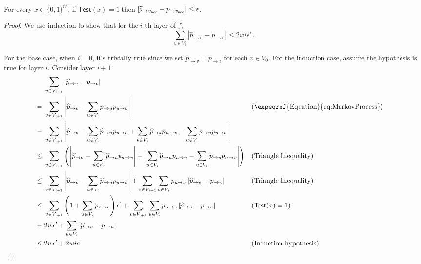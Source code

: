 \documentclass{toc}
\begin{document}
\begin{lemma} \label{lem:PassingTestGivesGoodApprox}
For every $x \in \{0, 1\}^{n'}$, if $ \mathsf{Test}(x) = 1 $ then $ \left| \widehat{p}_{ \to v_{\normalfont\text{acc}}} - p_{ \to v_{\normalfont\text{acc}} } \right| \leq \epsilon$.
\end{lemma}

\begin{proof}
We use induction to show that for the $i$-th layer of $f$,
\[ \sum_{v\in  V_i} \left|\widehat{p}_{\to v} - p_{ \to v} \right| \leq 2wi\epsilon'\,. \]

For the base case, when $i=0$, it's trivially true since we set $\widehat{p}_{\to v} = p_{\to v}$ for each $v \in V_0$. For the induction case, assume the hypothesis is true for layer $i$. Consider layer $i+1$.  
\begin{align}
& \sum_{v\in V_{i+1}} \left| \widehat{p}_{\to v} - p_{\to v} \right| \nonumber \\
={} & \sum_{v\in V_{i+1}} \left| \widehat{p}_{\to v} - \sum_{u\in V_i } p_{\to u} p_{u\to v} \right| 
&& (\text{\expeqref{Equation}{eq:MarkovProcess}}) \nonumber \\
={} & \sum_{v\in V_{i+1}} \left|  \widehat{p}_{ \to v} - \sum_{u\in V_i} \widehat{p}_{ \to u} p_{u\to v} +  \sum_{u\in V_i} \widehat{p}_{ \to u} p_{u\to v} - \sum_{u\in V_i} p_{ \to u}  p_{u\to v} \right|        \nonumber \\
\leq{} &\sum_{v\in V_{i+1}} \left(  \left|  \widehat{p}_{ \to v} - \sum_{u\in V_i} \widehat{p}_{ \to u} p_{u\to v} \right|  +  \left|  \sum_{u\in V_i} \widehat{p}_{ \to u}  p_{u\to v} - \sum_{u\in V_i} p_{ \to u}  p_{u\to v}  \right| \right) && \text{(Triangle Inequality)}    \nonumber \\
\leq{} & \sum_{v\in V_{i+1}} \left| \widehat{p}_{ \to v} - \sum_{u\in V_i} \widehat{p}_{ \to u} p_{u\to v} \right| + \sum_{v\in V_{i+1}} \sum_{u\in V_i} p_{u\to v} \left| \widehat{p}_{ \to u} - p_{ \to u} \right|     
&& \text{(Triangle Inequality)} \nonumber \\
\leq{} & \sum_{v\in V_{i+1}} \left( 1 + \sum_{u\in V_i} p_{u \to v} \right) \epsilon' + \sum_{v\in V_{i+1}} \sum_{u\in V_i} p_{u\to v} \left| \widehat{p}_{ \to u} - p_{ \to u} \right|
&& ( \mathsf{Test}(x) =1   ) \nonumber \\
={} & 2w\epsilon' + \sum_{u\in V_i} |\widehat{p}_{ \to u} -p_{ \to u}|
&&
\label{eqn:test-sufficient}\\
\leq{} & 2w\epsilon' + 2wi\epsilon'
&& \text{(Induction hypothesis)} \nonumber\\

\end{align}
\end{proof}
\end{document}
